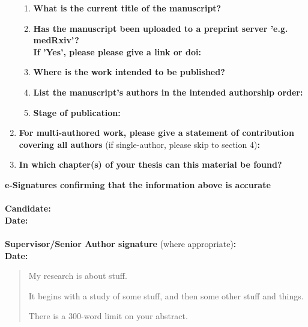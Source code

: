 \begin{enumerate}
        \begin{enumerate}\itemsep0em
            \item \textbf{What is the current title of the manuscript?}
            \item \textbf{Has the manuscript been uploaded to a preprint server 'e.g. medRxiv'? 
            \\
            If 'Yes', please please give a link or doi:}
            \item \textbf{Where is the work intended to be published?}
            \item \textbf{List the manuscript's authors in the intended authorship order:}
            \item \textbf{Stage of publication:}
        \end{enumerate}
        
        \item \textbf{For multi-authored work, please give a statement of contribution covering all authors} (if single-author, please skip to section 4)\textbf{:}
        \item \textbf{In which chapter(s) of your thesis can this material be found?}
    \end{enumerate}
    
    \textbf{e-Signatures confirming that the information above is accurate}\\
    \textbf{}\\ 
    \textbf{Candidate:}\\
    \textbf{Date:}\\
    \textbf{}\\
    \textbf{Supervisor/Senior Author signature} (where appropriate)\textbf{:}\\
    \textbf{Date:}	


\begin{abstract} %
My research is about stuff.

It begins with a study of some stuff, and then some other stuff and things.

There is a 300-word limit on your abstract.
\end{abstract}

